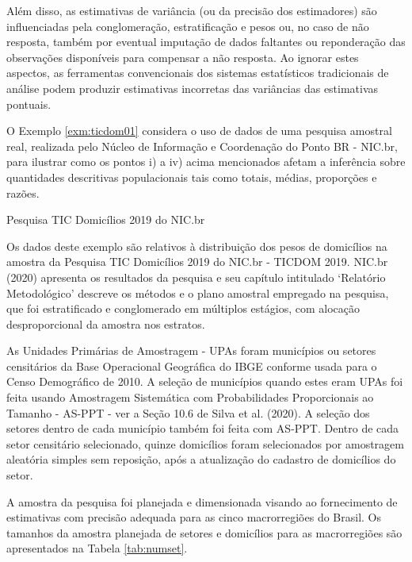 \documentclass[
  12pt,
  brazilian,
]{book}
\theoremstyle{definition}
\theoremstyle{definition}
\theoremstyle{definition}
\theoremstyle{definition}
\theoremstyle{remark}
\begin{document}
Além disso, as estimativas de variância (ou da precisão dos estimadores) são influenciadas pela conglomeração, estratificação e pesos ou, no caso de não resposta, também por eventual imputação de dados faltantes ou reponderação das observações disponíveis para compensar a não resposta. Ao ignorar estes aspectos, as ferramentas convencionais dos sistemas estatísticos tradicionais de análise podem produzir estimativas incorretas das variâncias das estimativas pontuais.

O Exemplo \ref{exm:ticdom01} considera o uso de dados de uma pesquisa amostral real, realizada pelo Núcleo de Informação e Coordenação do Ponto BR - NIC.br, para ilustrar como os pontos i) a iv) acima mencionados afetam a inferência sobre quantidades descritivas populacionais tais como
totais, médias, proporções e razões.

\textbf{\label{exm:ticdom01}} Pesquisa TIC Domicílios 2019 do NIC.br

Os dados deste exemplo são relativos à distribuição dos pesos de domicílios na amostra da Pesquisa TIC Domicílios 2019 do NIC.br - TICDOM 2019. NIC.br (2020) apresenta os resultados da pesquisa e seu capítulo intitulado `Relatório Metodológico' descreve os métodos e o plano amostral empregado na pesquisa, que foi estratificado e conglomerado em múltiplos estágios, com alocação desproporcional da amostra nos estratos.

As Unidades Primárias de Amostragem - UPAs foram municípios ou setores censitários da Base Operacional Geográfica do IBGE conforme usada para o Censo Demográfico de 2010. A seleção de municípios quando estes eram UPAs foi feita usando Amostragem Sistemática com Probabilidades Proporcionais ao Tamanho - AS-PPT - ver a Seção 10.6 de Silva et al. (2020). A seleção dos setores dentro de cada município também foi feita com AS-PPT. Dentro de cada setor censitário selecionado, quinze domicílios foram selecionados por amostragem aleatória simples sem reposição, após a atualização do cadastro de domicílios do setor.

A amostra da pesquisa foi planejada e dimensionada visando ao fornecimento de estimativas com precisão adequada para as cinco macrorregiões do Brasil. Os tamanhos da amostra planejada de setores e domicílios para as macrorregiões são apresentados na Tabela \ref{tab:numset}.
\end{document}
